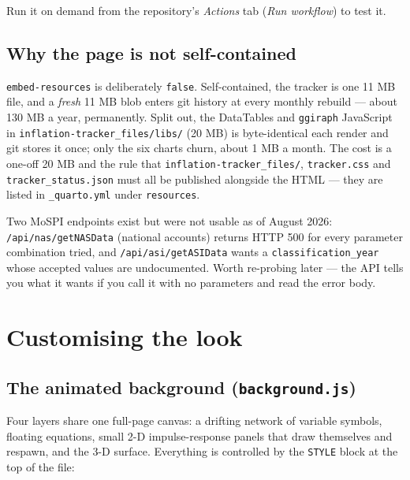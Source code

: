 \documentclass[11pt,a4paper]{article}
\newcommand{\file}[1]{\texttt{#1}}
\begin{document}
Run it on demand from the repository's \emph{Actions} tab
(\emph{Run workflow}) to test it.

\subsection{Why the page is not self-contained}

\texttt{embed-resources} is deliberately \texttt{false}. Self-contained, the
tracker is one 11 MB file, and a \emph{fresh} 11 MB blob enters git history
at every monthly rebuild --- about 130 MB a year, permanently. Split out,
the DataTables and \texttt{ggiraph} JavaScript in
\file{inflation-tracker\_files/libs/} (20 MB) is byte-identical each render
and git stores it once; only the six charts churn, about 1 MB a month.
The cost is a one-off 20 MB and the rule that
\file{inflation-tracker\_files/}, \file{tracker.css} and
\file{tracker\_status.json} must all be published alongside the HTML ---
they are listed in \file{\_quarto.yml} under \texttt{resources}.

\bigskip

Two MoSPI endpoints exist but were not usable as of August 2026:
\texttt{/api/nas/getNASData} (national accounts) returns HTTP 500 for every
parameter combination tried, and \texttt{/api/asi/getASIData} wants a
\texttt{classification\_year} whose accepted values are undocumented. Worth
re-probing later --- the API tells you what it wants if you call it with no
parameters and read the error body.

\section{Customising the look}

\subsection{The animated background (\file{background.js})}
Four layers share one full-page canvas: a drifting network of variable
symbols, floating equations, small 2-D impulse-response panels that draw
themselves and respawn, and the 3-D surface. Everything is controlled by the
\texttt{STYLE} block at the top of the file:
\end{document}
